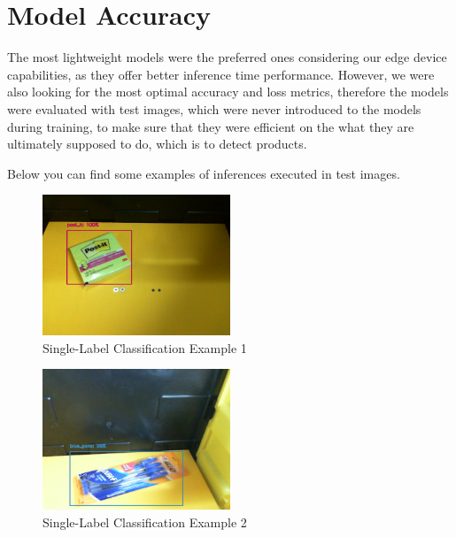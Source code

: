 \documentclass[openright]{normas-utf-tex} %
\begin{document}
\section{Model Accuracy}

The most lightweight models were the preferred ones considering our edge device capabilities,
as they offer better inference time performance. 
However, we were also looking for the most optimal accuracy and loss metrics, 
therefore the models were evaluated with test images, which were never introduced to the models
during training, to make sure that they were efficient on the what they are ultimately supposed to do, 
which is to detect products.

Below you can find some examples of inferences executed in test images. 

\begin{figure}[H]
	\centering
	\includegraphics[width=0.5\textwidth]{./images/singlelabel-classification-1.png}
	\caption[Single-Label Classification Example 1]{Single-Label Classification Example 1}
\end{figure}

\begin{figure}[H]
	\centering
	\includegraphics[width=0.5\textwidth]{./images/singlelabel-classification-2.png}
	\caption[Single-Label Classification Example 2]{Single-Label Classification Example 2}
\end{figure}
\end{document}
